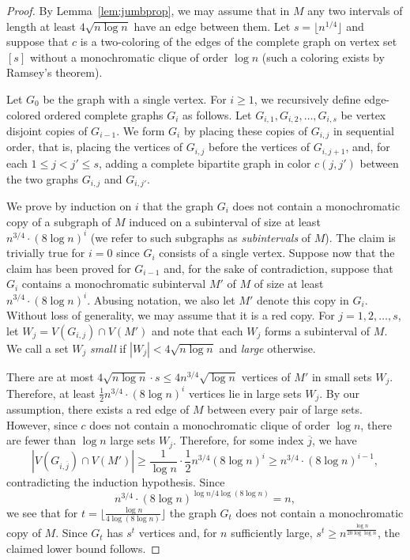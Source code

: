 \documentclass[11pt]{article}
\begin{document}
\begin{proof} 
By Lemma~\ref{lem:jumbprop}, we may assume that in $M$ any two intervals of length at least $4 \sqrt{n \log n}$ have an edge between them.
Let $s = \lfloor n^{1/4} \rfloor$ and suppose that $c$ is a two-coloring of the edges of the complete graph
on vertex set $[s]$ without a monochromatic clique of order
$\log n$ (such a coloring exists by Ramsey's theorem). 

Let $G_{0}$ be the graph with a single vertex. For $i\ge1$, we recursively
define edge-colored ordered complete graphs $G_{i}$ as follows. Let $G_{i,1},G_{i,2},\dots,G_{i, s}$
be vertex disjoint copies of $G_{i-1}$. We form $G_i$ by placing these copies
of $G_{i,j}$ in sequential order, that is, placing the vertices of $G_{i,j}$ before the vertices of
$G_{i,j+1}$, and, for each $1 \leq j < j' \leq s$, adding a complete bipartite graph in color $c(j,j')$ between the two graphs $G_{i,j}$
and $G_{i,j'}$.

We prove by induction on $i$ that the graph $G_{i}$ does not contain
a monochromatic copy of a subgraph of $M$ induced on a subinterval of size at least $n^{3/4}\cdot(8\log n)^{i}$ (we refer to such subgraphs as {\em subintervals} of $M$).
The claim is trivially true for $i=0$ since $G_{i}$ consists of
a single vertex. Suppose now that the claim has been
proved for $G_{i-1}$ and, for the sake of contradiction, suppose that
$G_{i}$ contains a monochromatic subinterval $M'$ of $M$ of size at least $n^{3/4}\cdot(8\log n)^{i}$.
Abusing notation, we also let $M'$ denote this copy in $G_{i}$. Without
loss of generality, we may assume that it is a red copy. For $j=1,2,\dots, s$,
let $W_{j}=V(G_{i,j})\cap V(M')$ and note that each $W_j$ forms a subinterval of $M$. We call a set $W_{j}$ \emph{small
}if $|W_{j}| < 4\sqrt{n \log n}$ and \emph{large} otherwise. 

There are at most $4 \sqrt{n \log n} \cdot s \leq 4 n^{3/4} \sqrt{\log n}$ vertices of $M'$ in small
sets $W_{j}$. Therefore, at least $\frac{1}{2}n^{3/4}\cdot(8\log n)^{i}$
vertices lie in large sets $W_{j}$. By our assumption, there exists a red edge of $M$ between every pair of large
sets. However, since $c$ does not contain a monochromatic clique
of order $\log n$, there are fewer than $\log n$
large sets $W_{j}$. Therefore, for some index $\overline{j}$, we have
\[
	|V(G_{i,{\overline{j}}})\cap V(M')|
	\ge \frac{1}{\log n} \cdot \frac{1}{2} n^{3/4} (8\log n)^{i}
	\ge n^{3/4}\cdot(8\log n)^{i-1},
\]
contradicting the induction hypothesis. Since 
\[
n^{3/4}\cdot(8\log n)^{\log n/4\log(8\log n)}=n,
\]
we see that for $t = \lfloor \frac{\log n}{4 \log(8 \log n)} \rfloor$ the graph $G_{t}$
does not contain a monochromatic copy of $M$. Since $G_{t}$ has
$s^{t}$ vertices and, for $n$ sufficiently large, $s^t \geq n^{\frac{\log n}{20\log\log n}}$, 
the claimed lower bound follows.
\end{proof}
\end{document}
